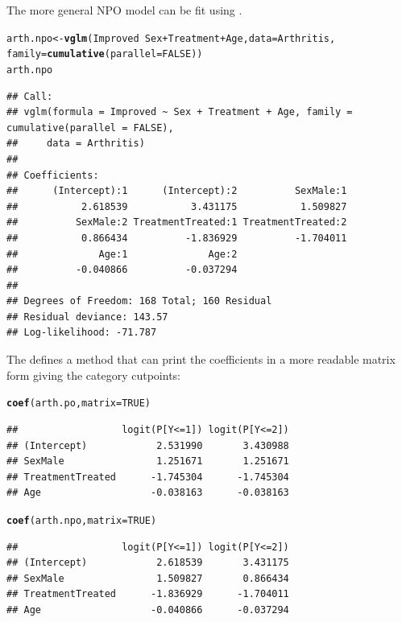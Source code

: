 \documentclass[11pt]{book}\usepackage[]{graphicx}\usepackage[]{color}
\makeatletter
\newcommand{\hlnum}[1]{\textcolor[rgb]{0.686,0.059,0.569}{#1}}%
\newcommand{\hlopt}[1]{\textcolor[rgb]{0,0,0}{#1}}%
\newcommand{\hlstd}[1]{\textcolor[rgb]{0.345,0.345,0.345}{#1}}%
\newcommand{\hlkwb}[1]{\textcolor[rgb]{0.69,0.353,0.396}{#1}}%
\newcommand{\hlkwc}[1]{\textcolor[rgb]{0.333,0.667,0.333}{#1}}%
\newcommand{\hlkwd}[1]{\textcolor[rgb]{0.737,0.353,0.396}{\textbf{#1}}}%
\newenvironment{kframe}{%
 \def\at@end@of@kframe{}%
 \ifinner\ifhmode%
  \def\at@end@of@kframe{\end{minipage}}%
  \begin{minipage}{\columnwidth}%
 \fi\fi%
 \def\FrameCommand##1{\hskip\@totalleftmargin \hskip-\fboxsep
 \colorbox{shadecolor}{##1}\hskip-\fboxsep
     \hskip-\linewidth \hskip-\@totalleftmargin \hskip\columnwidth}%
 \MakeFramed {\advance\hsize-\width
   \@totalleftmargin\z@ \linewidth\hsize
   \@setminipage}}%
 {\par\unskip\endMakeFramed%
 \at@end@of@kframe}
\newenvironment{knitrout}{}{} %
\renewenvironment{knitrout}{\small\renewcommand{\baselinestretch}{.85}}{} %
\makeatother
\begin{document}
The more general NPO model can be fit using .
\begin{knitrout}
\color{fgcolor}\begin{kframe}
\begin{alltt}
\hlstd{arth.npo} \hlkwb{<-} \hlkwd{vglm}\hlstd{(Improved} \hlopt{~} \hlstd{Sex} \hlopt{+} \hlstd{Treatment} \hlopt{+} \hlstd{Age,} \hlkwc{data}\hlstd{=Arthritis,}
                 \hlkwc{family} \hlstd{=} \hlkwd{cumulative}\hlstd{(}\hlkwc{parallel}\hlstd{=}\hlnum{FALSE}\hlstd{))}
\hlstd{arth.npo}
\end{alltt}
\begin{verbatim}
## Call:
## vglm(formula = Improved ~ Sex + Treatment + Age, family = cumulative(parallel = FALSE), 
##     data = Arthritis)
## 
## Coefficients:
##      (Intercept):1      (Intercept):2          SexMale:1 
##           2.618539           3.431175           1.509827 
##          SexMale:2 TreatmentTreated:1 TreatmentTreated:2 
##           0.866434          -1.836929          -1.704011 
##              Age:1              Age:2 
##          -0.040866          -0.037294 
## 
## Degrees of Freedom: 168 Total; 160 Residual
## Residual deviance: 143.57 
## Log-likelihood: -71.787
\end{verbatim}
\end{kframe}
\end{knitrout}
The  defines a  method that can print the coefficients
in a more readable matrix form giving the category cutpoints:
\begin{knitrout}
\color{fgcolor}\begin{kframe}
\begin{alltt}
\hlkwd{coef}\hlstd{(arth.po,} \hlkwc{matrix}\hlstd{=}\hlnum{TRUE}\hlstd{)}
\end{alltt}
\begin{verbatim}
##                  logit(P[Y<=1]) logit(P[Y<=2])
## (Intercept)            2.531990       3.430988
## SexMale                1.251671       1.251671
## TreatmentTreated      -1.745304      -1.745304
## Age                   -0.038163      -0.038163
\end{verbatim}
\begin{alltt}
\hlkwd{coef}\hlstd{(arth.npo,} \hlkwc{matrix}\hlstd{=}\hlnum{TRUE}\hlstd{)}
\end{alltt}
\begin{verbatim}
##                  logit(P[Y<=1]) logit(P[Y<=2])
## (Intercept)            2.618539       3.431175
## SexMale                1.509827       0.866434
## TreatmentTreated      -1.836929      -1.704011
## Age                   -0.040866      -0.037294
\end{verbatim}
\end{kframe}
\end{knitrout}
\end{document}
